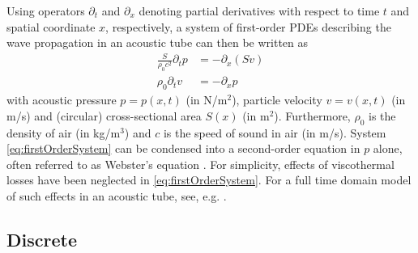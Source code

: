 Using operators $\partial_t$ and $\partial_x$ denoting partial derivatives with respect to time $t$ and spatial coordinate $x$, respectively, a system of first-order PDEs describing the wave propagation in an acoustic tube can then be written as \citeP[A]
\begin{subequations}\label{eq:firstOrderSystem}
    \begin{align}
        \frac{S}{\rho_0 c^2}\partial_t p &= -\partial_x(Sv)\label{eq:contPressure}\\
        \rho_0\partial_tv &= -\partial_xp\label{eq:contVelocity}
    \end{align}
\end{subequations}
with acoustic pressure $p = p(x,t)$ (in N/m$^2$), particle velocity $v = v(x,t)$ (in m/s) and (circular) cross-sectional area $S(x)$ (in m$^2$). Furthermore, $\rho_0$ is the density of air (in kg/m$^3$) and $c$ is the speed of sound in air (in m/s). System \eqref{eq:firstOrderSystem} can be condensed into a second-order equation in $p$ alone, often referred to as Webster's equation \cite{Webster19}.    For simplicity, effects of viscothermal losses have been neglected in \eqref{eq:firstOrderSystem}. For a full time domain model of such effects in an acoustic tube, see, e.g. \cite{Bilbao2016}. 
\subsection{Discrete}

